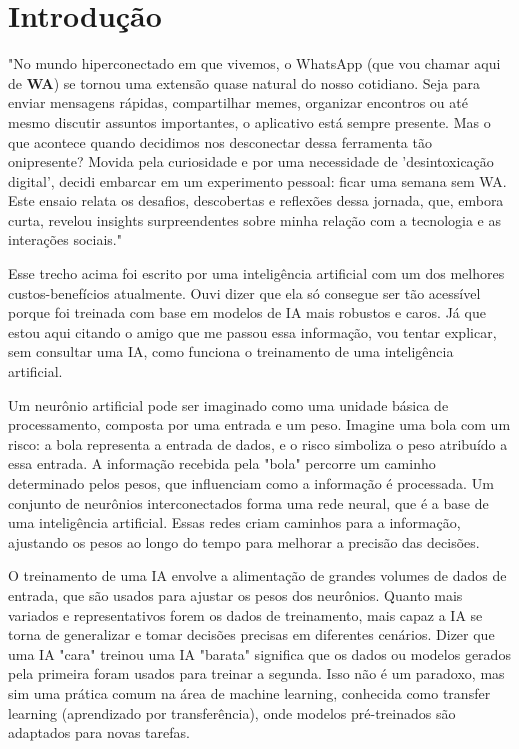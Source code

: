 \chapter{Introdução}\label{capitulo1}

"No mundo hiperconectado em que vivemos, o WhatsApp (que vou chamar aqui de \textbf{WA}) se tornou uma extensão quase natural do nosso cotidiano. Seja para enviar mensagens rápidas, compartilhar memes, organizar encontros ou até mesmo discutir assuntos importantes, o aplicativo está sempre presente. Mas o que acontece quando decidimos nos desconectar dessa ferramenta tão onipresente? Movida pela curiosidade e por uma necessidade de 'desintoxicação digital', decidi embarcar em um experimento pessoal: ficar uma semana sem WA. Este ensaio relata os desafios, descobertas e reflexões dessa jornada, que, embora curta, revelou insights surpreendentes sobre minha relação com a tecnologia e as interações sociais."

Esse trecho acima foi escrito por uma inteligência artificial com um dos melhores custos-benefícios atualmente. Ouvi dizer que ela só consegue ser tão acessível porque foi treinada com base em modelos de IA mais robustos e caros. Já que estou aqui citando o amigo que me passou essa informação, vou tentar explicar, sem consultar uma IA, como funciona o treinamento de uma inteligência artificial.

Um neurônio artificial pode ser imaginado como uma unidade básica de processamento, composta por uma entrada e um peso. Imagine uma bola com um risco: a bola representa a entrada de dados, e o risco simboliza o peso atribuído a essa entrada. A informação recebida pela "bola" percorre um caminho determinado pelos pesos, que influenciam como a informação é processada. Um conjunto de neurônios interconectados forma uma rede neural, que é a base de uma inteligência artificial. Essas redes criam caminhos para a informação, ajustando os pesos ao longo do tempo para melhorar a precisão das decisões.

O treinamento de uma IA envolve a alimentação de grandes volumes de dados de entrada, que são usados para ajustar os pesos dos neurônios. Quanto mais variados e representativos forem os dados de treinamento, mais capaz a IA se torna de generalizar e tomar decisões precisas em diferentes cenários. Dizer que uma IA "cara" treinou uma IA "barata" significa que os dados ou modelos gerados pela primeira foram usados para treinar a segunda. Isso não é um paradoxo, mas sim uma prática comum na área de machine learning, conhecida como transfer learning (aprendizado por transferência), onde modelos pré-treinados são adaptados para novas tarefas.

